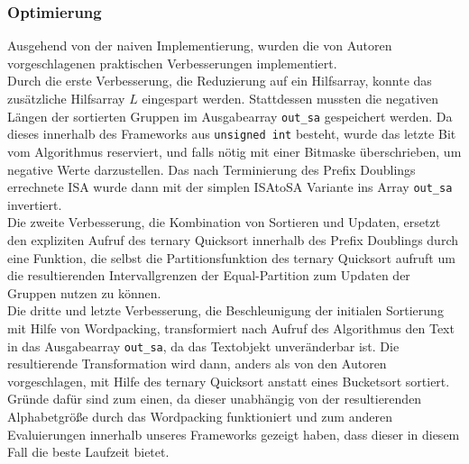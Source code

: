\subsubsection{Optimierung}
Ausgehend von der naiven Implementierung, wurden die von Autoren vorgeschlagenen praktischen Verbesserungen implementiert. \\
Durch die erste Verbesserung, die Reduzierung auf ein Hilfsarray, konnte das zusätzliche Hilfsarray $L$ eingespart werden. Stattdessen mussten die negativen Längen der sortierten Gruppen im Ausgabearray \texttt{out_sa} gespeichert werden. Da dieses innerhalb des Frameworks aus \texttt{unsigned int} besteht, wurde das letzte Bit vom Algorithmus reserviert, und falls nötig mit einer Bitmaske überschrieben, um \glqq negative\grqq{} Werte darzustellen. Das nach Terminierung des Prefix Doublings errechnete ISA wurde dann mit der simplen ISAtoSA Variante ins Array \texttt{out_sa} invertiert. \\
Die zweite Verbesserung, die Kombination von Sortieren und Updaten, ersetzt den expliziten Aufruf des ternary Quicksort innerhalb des Prefix Doublings durch eine Funktion, die selbst die Partitionsfunktion des ternary Quicksort aufruft um die resultierenden Intervallgrenzen der Equal-Partition zum Updaten der Gruppen nutzen zu können.\\
Die dritte und letzte Verbesserung, die Beschleunigung der initialen Sortierung mit Hilfe von Wordpacking, transformiert nach Aufruf des Algorithmus den Text in das Ausgabearray \texttt{out_sa}, da das Textobjekt unveränderbar ist. Die resultierende Transformation wird dann, anders als von den Autoren vorgeschlagen, mit Hilfe des ternary Quicksort anstatt eines Bucketsort sortiert. Gründe dafür sind zum einen, da dieser unabhängig von der resultierenden Alphabetgröße durch das Wordpacking funktioniert und zum anderen Evaluierungen innerhalb unseres Frameworks gezeigt haben, dass dieser in diesem Fall die beste Laufzeit bietet.
